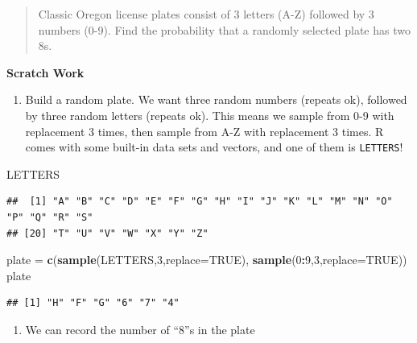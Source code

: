 \documentclass[
]{book}
\newenvironment{Shaded}{\begin{snugshade}}{\end{snugshade}}
\newcommand{\AttributeTok}[1]{\textcolor[rgb]{0.13,0.29,0.53}{#1}}
\newcommand{\ConstantTok}[1]{\textcolor[rgb]{0.56,0.35,0.01}{#1}}
\newcommand{\DecValTok}[1]{\textcolor[rgb]{0.00,0.00,0.81}{#1}}
\newcommand{\FunctionTok}[1]{\textcolor[rgb]{0.13,0.29,0.53}{\textbf{#1}}}
\newcommand{\NormalTok}[1]{#1}
\newcommand{\OtherTok}[1]{\textcolor[rgb]{0.56,0.35,0.01}{#1}}
\newcommand{\SpecialCharTok}[1]{\textcolor[rgb]{0.81,0.36,0.00}{\textbf{#1}}}
\providecommand{\tightlist}{%
  \setlength{\itemsep}{0pt}\setlength{\parskip}{0pt}}
\theoremstyle{definition}
\theoremstyle{definition}
\theoremstyle{definition}
\theoremstyle{definition}
\theoremstyle{remark}
\begin{document}
\begin{quote}
Classic Oregon license plates consist of 3 letters (A-Z) followed by 3 numbers (0-9). Find the probability that a randomly selected plate has two 8s.
\end{quote}

\textbf{Scratch Work}

\begin{enumerate}
\def\labelenumi{\arabic{enumi}.}
\tightlist
\item
  Build a random plate. We want three random numbers (repeats ok), followed by three random letters (repeats ok). This means we sample from 0-9 with replacement 3 times, then sample from A-Z with replacement 3 times. R comes with some built-in data sets and vectors, and one of them is \texttt{LETTERS}!
\end{enumerate}

\begin{Shaded}
\begin{Highlighting}[]
\NormalTok{LETTERS}
\end{Highlighting}
\end{Shaded}

\begin{verbatim}
##  [1] "A" "B" "C" "D" "E" "F" "G" "H" "I" "J" "K" "L" "M" "N" "O" "P" "Q" "R" "S"
## [20] "T" "U" "V" "W" "X" "Y" "Z"
\end{verbatim}

\begin{Shaded}
\begin{Highlighting}[]
\NormalTok{plate }\OtherTok{=} \FunctionTok{c}\NormalTok{(}\FunctionTok{sample}\NormalTok{(LETTERS,}\DecValTok{3}\NormalTok{,}\AttributeTok{replace=}\ConstantTok{TRUE}\NormalTok{),}
          \FunctionTok{sample}\NormalTok{(}\DecValTok{0}\SpecialCharTok{:}\DecValTok{9}\NormalTok{,}\DecValTok{3}\NormalTok{,}\AttributeTok{replace=}\ConstantTok{TRUE}\NormalTok{))}
\NormalTok{plate}
\end{Highlighting}
\end{Shaded}

\begin{verbatim}
## [1] "H" "F" "G" "6" "7" "4"
\end{verbatim}

\begin{enumerate}
\def\labelenumi{\arabic{enumi}.}
\setcounter{enumi}{1}
\tightlist
\item
  We can record the number of ``8''s in the plate
\end{enumerate}
\end{document}
